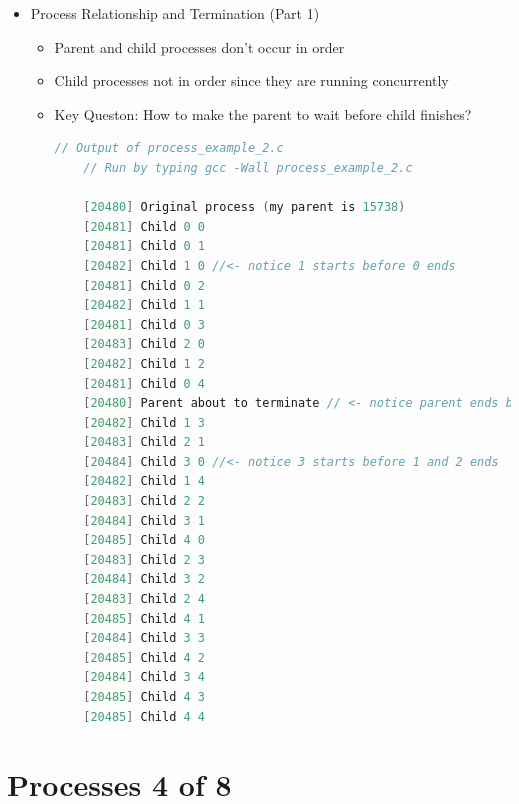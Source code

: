 \documentclass[12pt]{article}
\begin{document}
\begin{itemize}
    \item Process Relationship and Termination (Part 1)
    \begin{itemize}
        \item Parent and child processes don't occur in order
        \item Child processes not in order since they are running concurrently
        \item Key Queston: How to make the parent to wait before child finishes?
    \begin{lstlisting}[language=c]
    // Output of process_example_2.c
    // Run by typing gcc -Wall process_example_2.c

    [20480] Original process (my parent is 15738)
    [20481] Child 0 0
    [20481] Child 0 1
    [20482] Child 1 0 //<- notice 1 starts before 0 ends
    [20481] Child 0 2
    [20482] Child 1 1
    [20481] Child 0 3
    [20483] Child 2 0
    [20482] Child 1 2
    [20481] Child 0 4
    [20480] Parent about to terminate // <- notice parent ends before children
    [20482] Child 1 3
    [20483] Child 2 1
    [20484] Child 3 0 //<- notice 3 starts before 1 and 2 ends
    [20482] Child 1 4
    [20483] Child 2 2
    [20484] Child 3 1
    [20485] Child 4 0
    [20483] Child 2 3
    [20484] Child 3 2
    [20483] Child 2 4
    [20485] Child 4 1
    [20484] Child 3 3
    [20485] Child 4 2
    [20484] Child 3 4
    [20485] Child 4 3
    [20485] Child 4 4
    \end{lstlisting}
    \end{itemize}
\end{itemize}

\bigskip

\section*{Processes 4 of 8}

\bigskip
\end{document}
